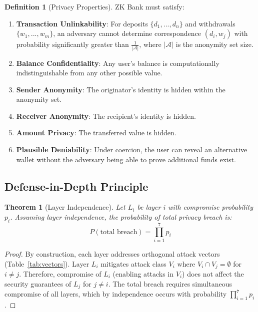 \documentclass[11pt]{article}
\theoremstyle{definition}
\newtheorem{definition}{Definition}[section]
\theoremstyle{plain}
\newtheorem{theorem}{Theorem}[section]
\theoremstyle{remark}
\begin{document}
\begin{definition}[Privacy Properties]
ZK Bank must satisfy:
\begin{enumerate}
    \item \textbf{Transaction Unlinkability}: For deposits $\{d_1, ..., d_n\}$ and withdrawals $\{w_1, ..., w_m\}$, an adversary cannot determine correspondence $(d_i, w_j)$ with probability significantly greater than $\frac{1}{|\mathcal{A}|}$, where $|\mathcal{A}|$ is the anonymity set size.
    
    \item \textbf{Balance Confidentiality}: Any user's balance is computationally indistinguishable from any other possible value.
    
    \item \textbf{Sender Anonymity}: The originator's identity is hidden within the anonymity set.
    
    \item \textbf{Receiver Anonymity}: The recipient's identity is hidden.
    
    \item \textbf{Amount Privacy}: The transferred value is hidden.
    
    \item \textbf{Plausible Deniability}: Under coercion, the user can reveal an alternative wallet without the adversary being able to prove additional funds exist.
\end{enumerate}
\end{definition}

\subsection{Defense-in-Depth Principle}

\begin{theorem}[Layer Independence]
\label{thm:independence}
Let $L_i$ be layer $i$ with compromise probability $p_i$. Assuming layer independence, the probability of total privacy breach is:
\begin{equation}
P(\text{total breach}) = \prod_{i=1}^{7} p_i
\end{equation}
\end{theorem}

\begin{proof}
By construction, each layer addresses orthogonal attack vectors (Table~\ref{tab:vectors}). Layer $L_i$ mitigates attack class $V_i$ where $V_i \cap V_j = \emptyset$ for $i \neq j$. Therefore, compromise of $L_i$ (enabling attacks in $V_i$) does not affect the security guarantees of $L_j$ for $j \neq i$. The total breach requires simultaneous compromise of all layers, which by independence occurs with probability $\prod_{i=1}^{7} p_i$.
\end{proof}
\end{document}

